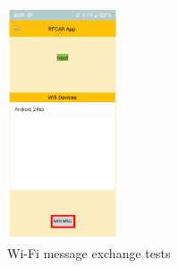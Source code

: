 %
\begin{figure}[!ht]
\centering
\includegraphics[width=0.3\textwidth]{img/phone-wifi-message.png}
\caption{\label{fig:phone-wifi-messages}Wi-Fi message exchange tests}
\end{figure}
%
%